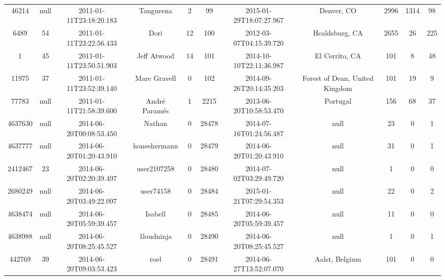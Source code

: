\documentclass[12pt,a4paper,twoside,openright,titlepage,final]{article}
\begin{document}
\begin{enumerate}
\begin{table}[htbp!]
{\begin{tabular}{@{}ccccccccccc@{}}
			46214     & null & 2011-01-11T23:18:20.183 & Tangurena             & 2         & 99    & 2015-01-29T18:07:27.967 & Denver, CO                       & 2996       & 1314    & 98    \\
			6489      & 54   & 2011-01-11T23:22:56.433 & Dori                  & 12        & 100   & 2012-03-07T04:15:39.720 & Healdsburg, CA                   & 2655       & 26      & 225   \\
			1         & 45   & 2011-01-11T23:50:51.903 & Jeff Atwood           & 14        & 101   & 2014-10-10T22:11:36.987 & El Cerrito, CA                   & 101        & 8       & 48    \\
			11975     & 37   & 2011-01-11T23:52:39.140 & Marc Gravell          & 0         & 102   & 2014-09-26T20:14:35.203 & Forest of Dean, United Kingdom   & 101        & 19      & 9     \\
			77783     & null & 2011-01-11T21:58:39.600 & André Paramés         & 1         & 2215  & 2013-06-20T10:58:53.470 & Portugal                         & 156        & 68      & 37    \\
			4637630   & null & 2014-06-20T00:08:53.450 & Nathan                & 0         & 28478 & 2014-07-16T01:24:56.487 & null                             & 23         & 0       & 1     \\
			4637777   & null & 2014-06-20T01:20:43.910 & honeehermann          & 0         & 28479 & 2014-06-20T01:20:43.910 & null                             & 31         & 0       & 1     \\
			2412467   & 23   & 2014-06-20T02:20:39.497 & user2107258           & 0         & 28480 & 2014-07-02T03:29:49.720 & null                             & 1          & 0       & 0     \\
			2680249   & null & 2014-06-20T03:49:22.097 & user74158             & 0         & 28484 & 2015-01-21T07:29:54.353 & null                             & 22         & 0       & 2     \\
			4638474   & null & 2014-06-20T05:59:39.457 & Isabell               & 0         & 28485 & 2014-06-20T05:59:39.457 & null                             & 11         & 0       & 0     \\
			4638988   & null & 2014-06-20T08:25:45.527 & 1loudninja            & 0         & 28490 & 2014-06-20T08:25:45.527 & null                             & 1          & 0       & 1     \\
			442769    & 39   & 2014-06-20T09:03:53.423 & roel                  & 0         & 28491 & 2014-06-27T13:52:07.070 & Aalst, Belgium                   & 101        & 0       & 0     \\

\end{tabular}}
\end{table}
\end{enumerate}
\end{document}
